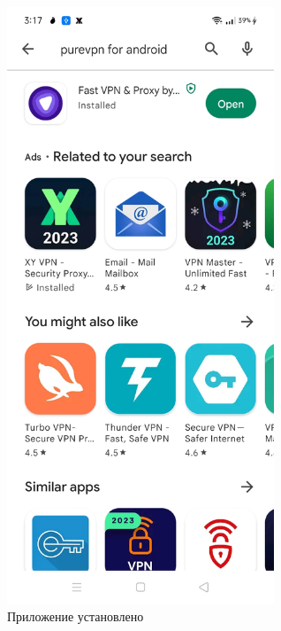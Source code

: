 \begin{itemize}
\begin{figure}[H]
\includegraphics[width=8cm]{32.png}
\centering
\caption{Приложение установлено}
\label{fig:41}
\end{figure}
\end{itemize}

